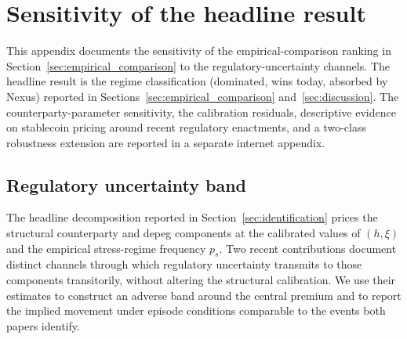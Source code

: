 \section{Sensitivity of the headline result}\label{app:sensitivity}

This appendix documents the sensitivity of the empirical-comparison ranking in Section~\ref{sec:empirical_comparison} to the regulatory-uncertainty channels. The headline result is the regime classification (dominated, wins today, absorbed by Nexus) reported in Sections~\ref{sec:empirical_comparison} and~\ref{sec:discussion}. The counterparty-parameter sensitivity, the calibration residuals, descriptive evidence on stablecoin pricing around recent regulatory enactments, and a two-class robustness extension are reported in a separate internet appendix.

\subsection{Regulatory uncertainty band}\label{sub:regulatory_uncertainty_band}

The headline decomposition reported in Section~\ref{sec:identification} prices the structural counterparty and depeg components at the calibrated values of $(h, \xi)$ and the empirical stress-regime frequency $p_s$. Two recent contributions document distinct channels through which regulatory uncertainty transmits to those components transitorily, without altering the structural calibration. We use their estimates to construct an adverse band around the central premium and to report the implied movement under episode conditions comparable to the events both papers identify.

